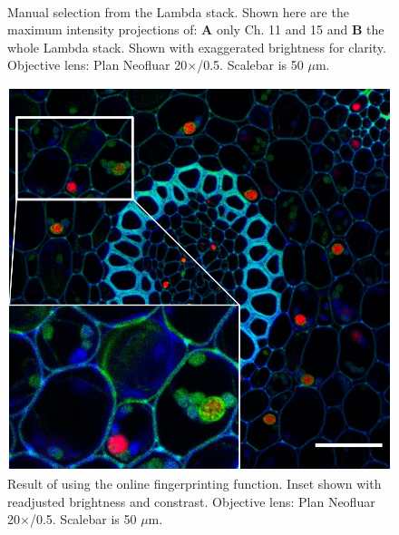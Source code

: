 \begin{figure}[h!]
\centering
\captionsetup[subfigure]{position=bottom}
\hspace{0.1mm}
\\
\caption{Manual selection from the Lambda stack. 
Shown here are the maximum intensity projections of: \textbf{A} only Ch. 11 and 15 and \textbf{B} the whole Lambda stack. 
Shown with exaggerated brightness for clarity.  
Objective lens: Plan Neofluar 20$\times$/0.5. 
Scalebar is 50 $\mu$m.} 
\label{fig:manlinun}
\end{figure}

\begin{figure}[h!]
\centering
\includegraphics[width=.4\columnwidth]{Exp_3_LSM/Figures/MS3/F2_olfp5_50um}
\caption{Result of using the online fingerprinting function. 
Inset shown with readjusted brightness and constrast. 
Objective lens: Plan Neofluar 20$\times$/0.5. 
Scalebar is 50 $\mu$m.}
\label{fig:olfp}
\end{figure}

